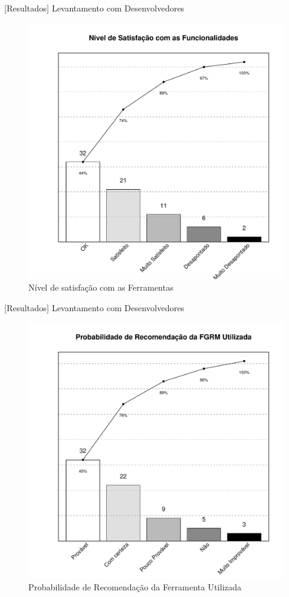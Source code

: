 \documentclass[t,14pt,mathserif]{beamer}
\begin{document}
\begin{frame}{[Resultados] Levantamento com Desenvolvedores}

\begin{figure}[htpb] \centering
    \includegraphics[width=0.5\linewidth]{../img/grafico_melhorias_fgrm_nivel_satisfacao.pdf}
    \caption{Nível de satisfação com as Ferramentas}
\label{fig:grafico_melhorias_fgrm_nivel_satisfacao}
\end{figure}

\end{frame}

\begin{frame}{[Resultados] Levantamento com Desenvolvedores}

\begin{figure}[htpb]
	\centering
	\includegraphics[width=0.45\linewidth]{../img/grafico_melhorias_fgrm_probabilidade_recomentacao.pdf}
	\caption{Probabilidade de Recomendação da Ferramenta Utilizada}
\label{fig:grafico_melhorias_fgrm_probabilidade_recomentacao}
\end{figure}

\end{frame}
\end{document}
